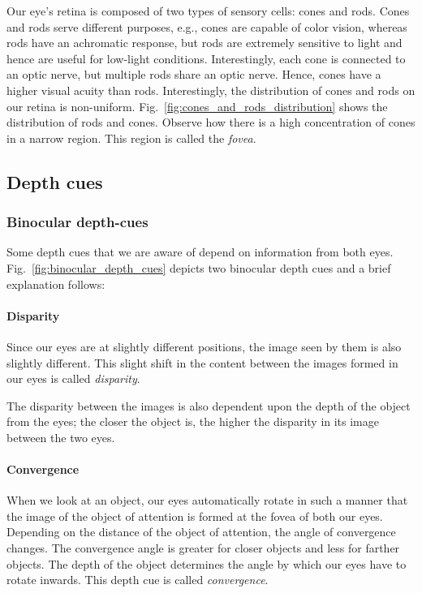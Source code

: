 

Our eye’s retina is composed of two types of sensory cells: cones and rods. 
Cones and rods serve different purposes, e.g., cones are capable of color vision, whereas rods have an achromatic response, but rods are extremely sensitive to light and hence are useful for low-light conditions.
Interestingly, each cone is connected to an optic nerve, but multiple rods share an optic nerve. 
Hence, cones have a higher visual acuity than rods. 
Interestingly, the distribution of cones and rods on our retina is non-uniform. 
Fig.~\ref{fig:cones_and_rods_distribution} shows the distribution of rods and cones. 
Observe how there is a high concentration of cones in a narrow region. This region is called the \emph{fovea}.

\subsection{Depth cues}
\label{sec:background:depth_cues}
\subsubsection{Binocular depth-cues}
\label{sec:background:binocular}


Some depth cues that we are aware of depend on information from both eyes. Fig.~\ref{fig:binocular_depth_cues} depicts two binocular depth cues and a brief explanation follows:

\paragraph{Disparity} Since our eyes are at slightly different positions, the image seen by them is also slightly different. 
This slight shift in the content between the images formed in our eyes is called \emph{disparity}. 


The disparity between the images is also dependent upon the depth of the object from the eyes; the closer the object is, the higher the disparity in its image between the two eyes. 

\paragraph{Convergence} When we look at an object, our eyes automatically rotate in such a manner that the image of the object of attention is formed at the fovea of both our eyes.
Depending on the distance of the object of attention, the angle of convergence changes. The convergence angle is greater for closer objects and less for farther objects.
The depth of the object determines the angle by which our eyes have to rotate inwards. This depth cue is called \emph{convergence}.

